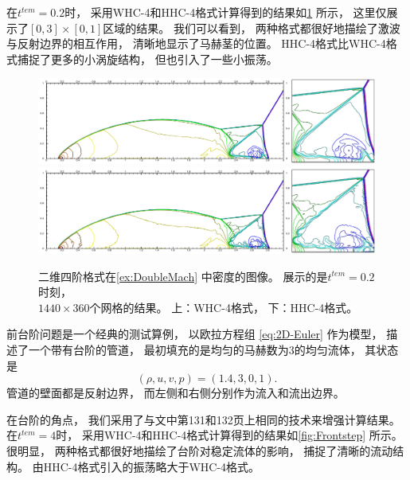 在$t^{tem}=0.2$时，
采用WHC-4和HHC-4格式计算得到的结果如\cref{fig:DoubleMach} 所示，
这里仅展示了$[0,3]\times[0,1]$区域的结果。
我们可以看到，
两种格式都很好地描绘了激波与反射边界的相互作用，
清晰地显示了马赫茎的位置。
HHC-4格式比WHC-4格式捕捉了更多的小涡旋结构，
但也引入了一些小振荡。

\begin{figure}[htbp]
  \centering
  \includegraphics[width=\textwidth]{fig/2D/DoubleMach_S2O4-WHC4_CFL0.600000.pdf}
  \includegraphics[width=\textwidth]{fig/2D/DoubleMach_S2O4-HHC4theta20_CFL0.600000.pdf}
  \caption{二维四阶格式在\cref{ex:DoubleMach} 中密度的图像。
    展示的是$t^{tem}=0.2$时刻，
    \\$1440 \times 360$个网格的结果。
    上：WHC-4格式，
    下：HHC-4格式。
  }
  \label{fig:DoubleMach}
\end{figure}

\begin{example}[二维欧拉方程组的前台阶问题]
  \label{ex:Frontstep}
  前台阶问题是一个经典的测试算例，
  以欧拉方程组 \cref{eq:2D-Euler} 作为模型，
  描述了一个带有台阶的管道，
  最初填充的是均匀的马赫数为$3$的均匀流体，
  其状态是
  \begin{equation}
    (\rho, u, v, p)= (1.4, 3, 0, 1).
  \end{equation}
  管道的壁面都是反射边界，
  而左侧和右侧分别作为流入和流出边界。
\end{example}

在台阶的角点，
我们采用了与文\cite{frontStep-BlastProblem}中第131和132页上相同的技术来增强计算结果。
在$t^{tem}=4$时，
采用WHC-4和HHC-4格式计算得到的结果如\cref{fig:Frontstep} 所示。
很明显，
两种格式都很好地描绘了台阶对稳定流体的影响，
捕捉了清晰的流动结构。
由HHC-4格式引入的振荡略大于WHC-4格式。

